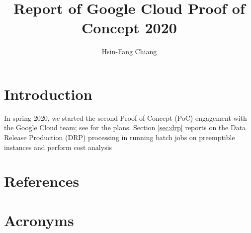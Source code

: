 \documentclass[DM,authoryear,toc,lsstdraft]{lsstdoc}
\title{Report of Google Cloud Proof of Concept 2020}
\author{%
Hsin-Fang Chiang
}
\date{\vcsDate}
\begin{document}
\maketitle

\section{Introduction}

In spring 2020, we started the second Proof of Concept (PoC) engagement with the Google Cloud team; see  for the plans.
Section \ref{sec:drp} reports on the Data Release Production (DRP) processing in running batch jobs on preemptible instances and perform cost analysis



\appendix
\section{References} \label{sec:bib}
\renewcommand{\refname}{} %


\section{Acronyms} \label{sec:acronyms}

\end{document}
